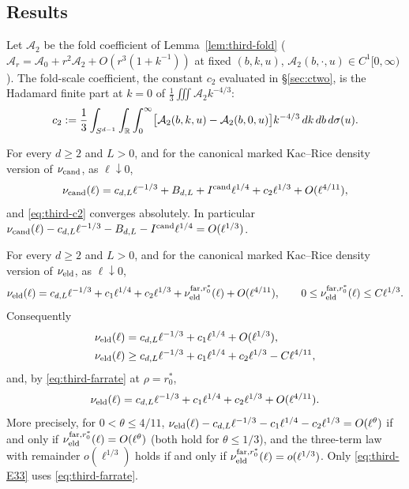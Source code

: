 \subsection{Results}\label{ssec:third-results}

Let $\mathcal A_2$ be the fold coefficient of Lemma~\ref{lem:third-fold} ($\mathcal A_r=\mathcal A_0+r^2\mathcal A_2+O(r^3(1+k^{-1}))$ at fixed $(b,k,u)$, $\mathcal A_2(b,\cdot,u)\in C^1[0,\infty)$). The fold-scale coefficient, the constant $c_2$ evaluated in \S\ref{sec:ctwo}, is the Hadamard finite part at $k=0$ of $\frac13\iiint \mathcal A_2k^{-4/3}$:
\begin{equation}\label{eq:third-c2}
c_2:=\frac13\int_{S^{d-1}}\int_\mathbb R\int_0^\infty\bigl[\mathcal A_2(b,k,u)-\mathcal A_2(b,0,u)\bigr]k^{-4/3}\,dk\,db\,d\sigma(u).
\end{equation}

\begin{theorem}\label{thm:third-T}
For every $d\ge2$ and $L>0$, and for the canonical marked Kac--Rice density version of $\nu_{\mathrm{cand}}$, as $\ell\downarrow0$,
\begin{equation}\label{eq:third-T1}
\nu_{\mathrm{cand}}(\ell)=c_{d,L}\ell^{-1/3}+B_{d,L}+I^{\mathrm{cand}}\ell^{1/4}+c_2\ell^{1/3}+O(\ell^{4/11}),
\end{equation}
and \eqref{eq:third-c2} converges absolutely. In particular $\nu_{\mathrm{cand}}(\ell)-c_{d,L}\ell^{-1/3}-B_{d,L}-I^{\mathrm{cand}}\ell^{1/4}=O(\ell^{1/3})$.
\end{theorem}

\begin{theorem}\label{thm:third-E3}
For every $d\ge2$ and $L>0$, and for the canonical marked Kac--Rice density version of $\nu_{\mathrm{eld}}$, as $\ell\downarrow0$,
\begin{equation}\label{eq:third-E30}
\nu_{\mathrm{eld}}(\ell)=c_{d,L}\ell^{-1/3}+c_1\ell^{1/4}+c_2\ell^{1/3}+\nu_{\mathrm{eld}}^{{\rm far},r_0^*}(\ell)+O(\ell^{4/11}),\qquad 0\le\nu_{\mathrm{eld}}^{{\rm far},r_0^*}(\ell)\le C\ell^{1/3}.
\end{equation}
Consequently
\begin{align}
\nu_{\mathrm{eld}}(\ell)&=c_{d,L}\ell^{-1/3}+c_1\ell^{1/4}+O(\ell^{1/3}),\label{eq:third-E31}\\
\nu_{\mathrm{eld}}(\ell)&\ge c_{d,L}\ell^{-1/3}+c_1\ell^{1/4}+c_2\ell^{1/3}-C\ell^{4/11},\label{eq:third-E32}
\end{align}
and, by \eqref{eq:third-farrate} at $\rho=r_0^*$,
\begin{equation}\label{eq:third-E33}
\nu_{\mathrm{eld}}(\ell)=c_{d,L}\ell^{-1/3}+c_1\ell^{1/4}+c_2\ell^{1/3}+O(\ell^{4/11}).
\end{equation}
More precisely, for $0<\theta\le4/11$, $\nu_{\mathrm{eld}}(\ell)-c_{d,L}\ell^{-1/3}-c_1\ell^{1/4}-c_2\ell^{1/3}=O(\ell^\theta)$ if and only if $\nu_{\mathrm{eld}}^{{\rm far},r_0^*}(\ell)=O(\ell^\theta)$ (both hold for $\theta\le1/3$), and the three-term law with remainder $o(\ell^{1/3})$ holds if and only if $\nu_{\mathrm{eld}}^{{\rm far},r_0^*}(\ell)=o(\ell^{1/3})$. Only \eqref{eq:third-E33} uses \eqref{eq:third-farrate}.
\end{theorem}

